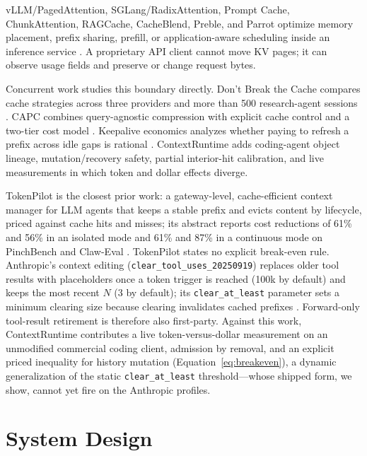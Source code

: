 \documentclass[10pt,twocolumn]{article}
\begin{document}
vLLM/PagedAttention, SGLang/RadixAttention, Prompt Cache, ChunkAttention, RAGCache, CacheBlend, Preble,
and Parrot optimize memory placement, prefix sharing, prefill, or application-aware scheduling inside
an inference service \cite{kwon2023pagedattention,zheng2024sglang,gim2024promptcache,
ye2024chunkattention,jin2024ragcache,yao2025cacheblend,srivatsa2024preble,lin2024parrot}.  A proprietary
API client cannot move KV pages; it can observe usage fields and preserve or change request bytes.

Concurrent work studies this boundary directly.  Don't Break the Cache compares cache
strategies across three providers and more than 500 research-agent sessions
\cite{lumer2026cache}.  CAPC combines query-agnostic compression with explicit cache control and a
two-tier cost model \cite{song2026capc}.  Keepalive economics analyzes whether paying to refresh a
prefix across idle gaps is rational \cite{khailo2026keepalive}.  ContextRuntime adds coding-agent
object lineage, mutation/recovery safety, partial interior-hit calibration, and live measurements in
which token and dollar effects diverge.

TokenPilot is the closest prior work: a gateway-level, cache-efficient context manager for LLM agents
that keeps a stable prefix and evicts content by lifecycle, priced against cache hits and misses; its
abstract reports cost reductions of 61\% and 56\% in an isolated mode and 61\% and 87\% in a continuous
mode on PinchBench and Claw-Eval \cite{xu2026tokenpilot}.  TokenPilot states no explicit break-even
rule.  Anthropic's context editing (\texttt{clear\_tool\_uses\_20250919}) replaces older tool results
with placeholders once a token trigger is reached (100k by default) and keeps the most recent $N$ (3
by default); its \texttt{clear\_at\_least} parameter sets a minimum clearing size because clearing
invalidates cached prefixes \cite{anthropicContextEditing}.  Forward-only tool-result retirement is
therefore also first-party.  Against this work, ContextRuntime contributes a live token-versus-dollar
measurement on an unmodified commercial coding client, admission by removal, and an explicit priced
inequality for history mutation (Equation~\ref{eq:breakeven}), a dynamic generalization of the static
\texttt{clear\_at\_least} threshold---whose shipped form, we show, cannot yet fire on the Anthropic
profiles.

\section{System Design}
\end{document}
